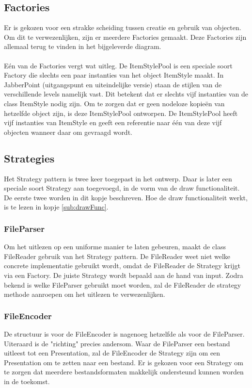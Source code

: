 \documentclass[a4paper]{article}
\newcommand{\1}[0]{\'{e}\'{e}n}
\begin{document}
\subsection{Factories}
Er is gekozen voor een strakke scheiding tussen creatie en gebruik van objecten. Om dit te verwezenlijken, zijn er meerdere Factories gemaakt. Deze Factories zijn allemaal terug te vinden in het bijgeleverde diagram.
\\\\
E\'{e}n van de Factories vergt wat uitleg. De ItemStylePool is een speciale soort Factory die slechts een paar instanties van het object ItemStyle maakt. In JabberPoint (uitgangspunt en uiteindelijke versie) staan de stijlen van de verschillende levels namelijk vast. Dit betekent dat er slechts vijf instanties van de class ItemStyle nodig zijn. Om te zorgen dat er geen nodeloze kopie\"{e}n van hetzelfde object zijn, is deze ItemStylePool ontworpen. De ItemStylePool heeft vijf instanties van ItemStyle en geeft een referentie naar \1 van deze vijf objecten wanneer daar om gevraagd wordt.

\subsection{Strategies}
Het Strategy pattern is twee keer toegepast in het ontwerp. Daar is later een speciale soort Strategy aan toegevoegd, in de vorm van de draw functionaliteit. De eerste twee worden in dit kopje beschreven. Hoe de draw functionaliteit werkt, is te lezen in kopje \ref{sub:drawFunc}.

\subsubsection{FileParser}
Om het uitlezen op een uniforme manier te laten gebeuren, maakt de class FileReader gebruik van het Strategy pattern. De FileReader weet niet welke concrete implementatie gebruikt wordt, omdat de FileReader de Strategy krijgt via een Factory. De juiste Strategy wordt bepaald aan de hand van input. Zodra bekend is welke FileParser gebruikt moet worden, zal de FileReader de strategy methode aanroepen om het uitlezen te verwezenlijken.

\subsubsection{FileEncoder}
De structuur is voor de FileEncoder is nagenoeg hetzelfde als voor de FileParser. Uiteraard is de "richting" precies andersom. Waar de FileParser een bestand uitleest tot een Presentation, zal de FileEncoder de Strategy zijn om een Presentation om te zetten naar een bestand. Er is gekozen voor een Strategy om te zorgen dat meerdere bestandsformaten makkelijk ondersteund kunnen worden in de toekomst.
\end{document}
